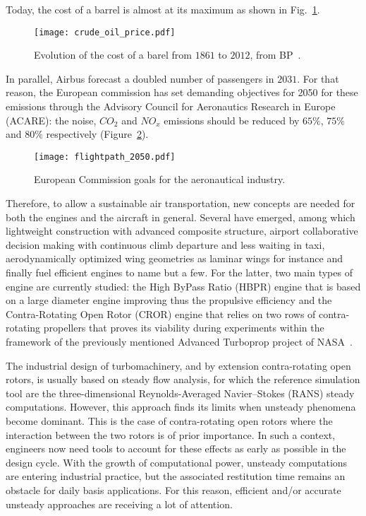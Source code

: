 Today, the cost of a barrel is almost at its maximum as shown
in Fig.~\ref{fig:crude_oil_price}.
\begin{figure}[htp]
  \centering
  \texttt{[image: crude\_oil\_price.pdf]}
  \caption{Evolution of the cost of a barel from $1861$ to $2012$, from BP~\cite{bpreview2013}.}
  \label{fig:crude_oil_price}
\end{figure}
In parallel, Airbus forecast a doubled number of passengers in
$2031$. For that reason, the European commission has set
demanding objectives for 2050 for these emissions
through the
Advisory Council for 
Aeronautics Research in Europe (ACARE):
the noise, $CO_2$ and $NO_x$ emissions should be reduced by 
$65\%$, $75\%$ and $80\%$ respectively
(Figure~\ref{fig:flightpath_2050}).
\begin{figure}[htp]
  \centering
  \texttt{[image: flightpath\_2050.pdf]}
  \caption{European Commission goals for the aeronautical industry.}
  \label{fig:flightpath_2050}
\end{figure}
Therefore, to allow a sustainable air transportation, new
concepts are needed for both the engines and the 
aircraft in general.
Several have emerged, among which lightweight construction
with advanced composite structure, airport collaborative decision
making with continuous climb departure and less waiting in taxi,
aerodynamically optimized wing geometries as laminar wings for instance
and finally fuel efficient engines to name but a few.
For the latter, two main types of engine are currently studied: the
High ByPass Ratio (HBPR) engine that is based on a
large diameter engine improving thus the
propulsive efficiency and the Contra-Rotating Open Rotor (CROR)
engine that relies on two rows of contra-rotating propellers
that proves its viability during experiments within the framework of
the previously mentioned Advanced Turboprop project of NASA~\cite{Hager1988}.

The industrial design of turbomachinery, and by extension contra-rotating
open rotors, is usually based on steady flow analysis, 
for which the reference simulation tool are the three-dimensio\-nal Reynolds-Averaged 
Navier--Stokes (RANS) steady computations. However, this approach finds its limits 
when unsteady phenomena become dominant. This is the case of 
contra-rotating open rotors where the interaction between the
two rotors is of prior importance. 
In such a
context, engineers now need tools to account for these effects as
early as possible in the design cycle. With the growth of
computational power, unsteady computations are entering industrial
practice, but the associated restitution time remains an obstacle for
daily basis applications.  For this reason, efficient and/or accurate
unsteady approaches are receiving a lot of attention. 

